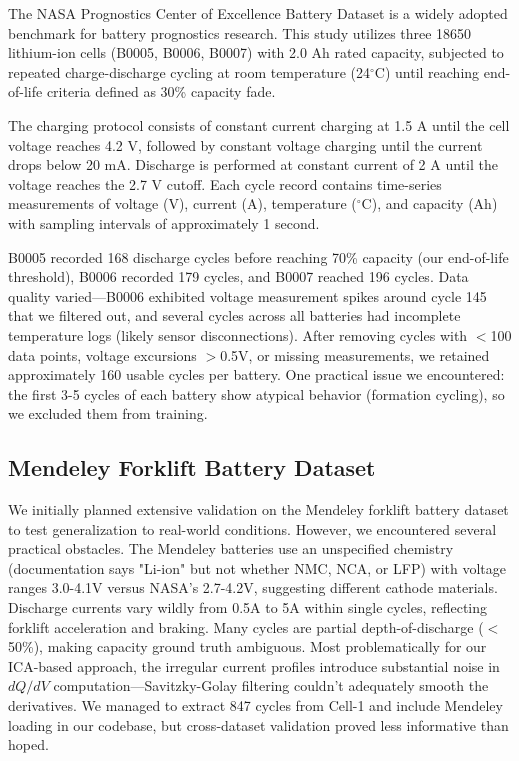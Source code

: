 \documentclass{sn-jnl}
\begin{document}
The NASA Prognostics Center of Excellence Battery Dataset \citep{saxena2008} is a widely adopted benchmark for battery prognostics research. This study utilizes three 18650 lithium-ion cells (B0005, B0006, B0007) with 2.0 Ah rated capacity, subjected to repeated charge-discharge cycling at room temperature (24$^\circ$C) until reaching end-of-life criteria defined as 30\% capacity fade.

The charging protocol consists of constant current charging at 1.5 A until the cell voltage reaches 4.2 V, followed by constant voltage charging until the current drops below 20 mA. Discharge is performed at constant current of 2 A until the voltage reaches the 2.7 V cutoff. Each cycle record contains time-series measurements of voltage (V), current (A), temperature ($^\circ$C), and capacity (Ah) with sampling intervals of approximately 1 second.

B0005 recorded 168 discharge cycles before reaching 70\% capacity (our end-of-life threshold), B0006 recorded 179 cycles, and B0007 reached 196 cycles. Data quality varied—B0006 exhibited voltage measurement spikes around cycle 145 that we filtered out, and several cycles across all batteries had incomplete temperature logs (likely sensor disconnections). After removing cycles with $<$100 data points, voltage excursions $>$0.5V, or missing measurements, we retained approximately 160 usable cycles per battery. One practical issue we encountered: the first 3-5 cycles of each battery show atypical behavior (formation cycling), so we excluded them from training.

\subsection{Mendeley Forklift Battery Dataset}
\label{subsec:mendeley}

We initially planned extensive validation on the Mendeley forklift battery dataset to test generalization to real-world conditions. However, we encountered several practical obstacles. The Mendeley batteries use an unspecified chemistry (documentation says "Li-ion" but not whether NMC, NCA, or LFP) with voltage ranges 3.0-4.1V versus NASA's 2.7-4.2V, suggesting different cathode materials. Discharge currents vary wildly from 0.5A to 5A within single cycles, reflecting forklift acceleration and braking. Many cycles are partial depth-of-discharge ($<$50\%), making capacity ground truth ambiguous. Most problematically for our ICA-based approach, the irregular current profiles introduce substantial noise in $dQ/dV$ computation—Savitzky-Golay filtering couldn't adequately smooth the derivatives. We managed to extract 847 cycles from Cell-1 and include Mendeley loading in our codebase, but cross-dataset validation proved less informative than hoped.
\end{document}
